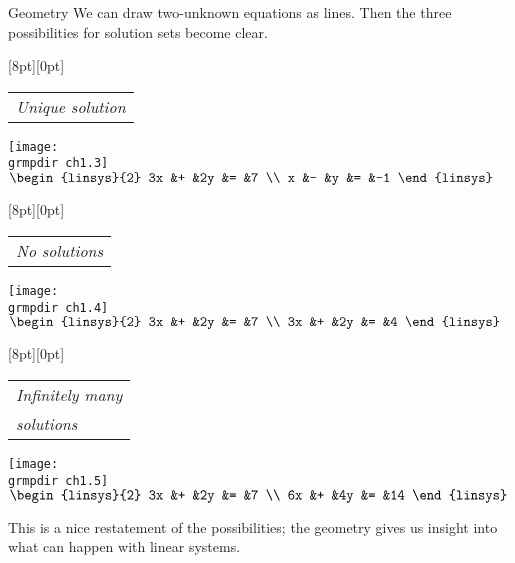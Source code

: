 \begin{frame}{Geometry} 
We can draw two-unknown equations as lines.
Then the three possibilities for solution sets become clear.
\pause
\begin{center} %
  \begin{minipage}[b]{1.35in}
    \raisebox{-2pt}[8pt][0pt]{\small \begin{tabular}{@{}l}
      \small \textit{Unique solution}
    \end{tabular}}
    \begin{center}
      \texttt{[image: \\grmpdir ch1.3]} \\[.75ex]
      \small $\begin{linsys}{2}
                         3x  &+  &2y  &=  &7   \\
                         x   &-  &y   &=  &-1
                       \end{linsys}$
    \end{center}
  \end{minipage}
  \hspace*{0em}
  \begin{minipage}[b]{1.35in}
    \raisebox{-2pt}[8pt][0pt]{\small \begin{tabular}{@{}l}
      \small \textit{No solutions}
    \end{tabular}}
    \begin{center}
      \texttt{[image: \\grmpdir ch1.4]} \\[.75ex]
      \small $\begin{linsys}{2}
                         3x  &+  &2y  &=  &7   \\
                         3x  &+  &2y  &=  &4
                       \end{linsys}$
    \end{center}
  \end{minipage}
  \hspace*{0em}
  \begin{minipage}[b]{1.35in}
    \raisebox{-2pt}[8pt][0pt]{\small \begin{tabular}[t]{@{}l}
      \textit{Infinitely many} \\
      \textit{solutions}
    \end{tabular}}
    \begin{center}
      \texttt{[image: \\grmpdir ch1.5]}         \\[.75ex]
      \small $ \begin{linsys}{2}
                         3x  &+  &2y  &=  &7   \\
                         6x  &+  &4y  &=  &14
                       \end{linsys}$
    \end{center}
  \end{minipage}
\end{center}
This is a nice restatement of the possibilities; 
the geometry gives us insight into what can happen with linear systems.
\end{frame}



